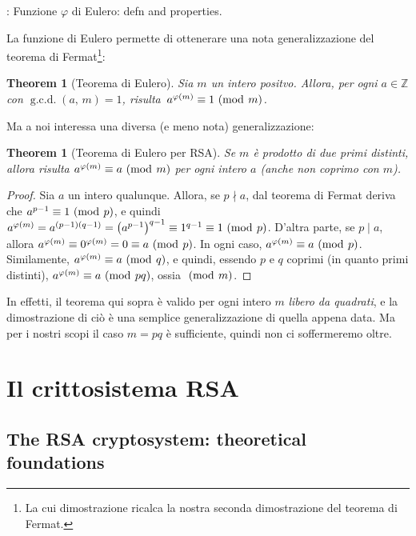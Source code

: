 \documentclass[pdflatex,11pt,a4paper,oneside]{article}
\renewcommand{\phi}{\varphi}
\newcommand{\XXX}[1][XXX]{\text{\bfseries{\color{red}{\emph{#1}}}}}
\newcommand{\TODO}[0]{\XXX[TODO]}
\newcommand{\p}[1]{\left({#1}\right)}
\newcommand{\Z}[0]{\mathbb{Z}}
\newcommand{\divides}[0]{\mid}
\newcommand{\notdivides}[0]{\nmid}
\newcommand{\congruent}[0]{\equiv}
\newcommand{\mmodop}[0]{\ensuremath{\operatorname{mod}}}
\newcommand{\mmod}[1]{\ensuremath{\allowbreak\ (\mmodop\:{#1})}}
\newcommand{\gcdop}[0]{\ensuremath{\operatorname{g.c.d.}}}
\newcommand{\xgcd}[1]{\ensuremath{\gcdop\left({#1}\right)}}
\renewcommand{\gcd}[2]{\xgcd{{#1},\,{#2}}}
\newtheorem{theorem}[TheoremLike]{Theorem}
\begin{document}
\TODO: Funzione $\phi$ di Eulero: defn and properties.

La funzione di Eulero permette di ottenerare una nota generalizzazione
del teorema di Fermat\footnote{La cui dimostrazione ricalca la nostra
seconda dimostrazione del teorema di Fermat.}:

\begin{theorem}[Teorema di Eulero]\label{thm:euler}
  Sia $m$ un intero positvo. Allora, per ogni $a \in \Z$ con
  $\gcd{a}{m} = 1$, risulta\, $a^{\phi(m)} \congruent 1 \mmod m$.
\end{theorem}

\noindent
Ma a noi interessa una diversa (e meno nota) generalizzazione:

\begin{theorem}[Teorema di Eulero per RSA]\label{thm:euler-rsa}
Se $m$ \`e prodotto di due primi \emph{distinti}, allora risulta
$a^{\phi(m)} \congruent a \mmod m$ per \emph{ogni} intero $a$ (anche
non coprimo con $m$).
\end{theorem}
%
\begin{proof}
Sia $a$ un intero qualunque.  Allora, se $p \notdivides a$, dal teorema
di Fermat deriva che $a^{p-1} \congruent 1 \mmod p$, e quindi
$a^{\phi(m)} = a^{(p-1)(q-1)} = {\p{a^{p-1}}}^{q-1} \congruent 1^{q-1}
\congruent 1 \mmod p$.  D'altra parte, se $p \divides a$, allora
$a^{\phi(m)} \congruent 0^{\phi(m)} = 0 \congruent a \mmod p$.  In ogni
caso, $a^{\phi(m)} \congruent a \mmod p$.  Similamente, $a^{\phi(m)}
\congruent a \mmod q$, e quindi, essendo $p$ e $q$ coprimi (in quanto
primi distinti), $a^{\phi(m)} \congruent a \mmod{pq}$, ossia $\mmod m$.
\end{proof}

In effetti, il teorema qui sopra \`e valido per ogni intero $m$
\emph{libero da quadrati}, e la dimostrazione di ci\`o \`e una
semplice generalizzazione di quella appena data.  Ma per i nostri
scopi il caso $m = pq$ \`e sufficiente, quindi non ci soffermeremo
oltre.


\section{Il crittosistema RSA}

\subsection{The RSA cryptosystem: theoretical foundations}
\end{document}
